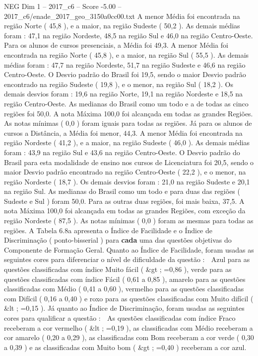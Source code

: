 \begin{textsample}{NEG Dim 1 – 2017\_c6 – Score -5.00 – 2017\_c6/enade\_2017\_geo\_3150a0cc00.txt}
A menor Média foi encontrada na região Norte ( 45,8 ), e a maior, na região Sudeste ( 50,2 ).
As demais médias foram : 47,1 na região Nordeste, 48,5 na região Sul e 46,0 na região Centro-Oeste.
Para os alunos de cursos presenciais, a Média foi 49,3.
A menor Média foi encontrada na região Norte ( 45,8 ), e a maior, na região Sul ( 55,5 ).
As demais médias foram : 47,7 na região Nordeste, 51,7 na região Sudeste e 46,6 na região Centro-Oeste.
O Desvio padrão do Brasil foi 19,5, sendo o maior Desvio padrão encontrado na região Sudeste ( 19,8 ), e o menor, na região Sul ( 18,2 ).
Os demais desvios foram : 19,6 na região Norte, 19,1 na região Nordeste e 18,5 na região Centro-Oeste.
As medianas do Brasil como um todo e a de todas as cinco regiões foi 50,0.
A nota Máxima 100,0 foi alcançada em todas as grandes Regiões.
As notas mínimas ( 0,0 ) foram iguais para todas as regiões.
Já para os alunos de cursos a Distância, a Média foi menor, 44,3.
A menor Média foi encontrada na região Nordeste ( 41,2 ), e a maior, na região Sudeste ( 46,0 ).
As demais médias foram : 43,9 na região Sul e 43,6 na região Centro-Oeste.
O Desvio padrão do Brasil para esta modalidade de ensino nos cursos de Licenciatura foi 20,5, sendo o maior Desvio padrão encontrado na região Centro-Oeste ( 22,2 ), e o menor, na região Nordeste ( 18,7 ).
Os demais desvios foram : 21,0 na região Sudeste e 20,1 na região Sul.
As medianas do Brasil como um todo e para duas das regiões ( Sudeste e Sul ) foram 50,0.
Para as outras duas regiões, foi mais baixa, 37,5.
A nota Máxima 100,0 foi alcançada em todas as grandes Regiões, com exceção da região Nordeste ( 87,5 ).
As notas mínimas ( 0,0 ) foram as mesmas para todas as regiões.
A Tabela 6.8a apresenta o Índice de Facilidade e o Índice de Discriminação ( ponto-bisserial ) para \textbf{cada} uma das questões objetivas do Componente de Formação Geral.
Quanto ao Índice de Facilidade, foram usadas as seguintes cores para diferenciar o nível de dificuldade da questão :  Azul para as questões classificadas com índice Muito fácil ( \&gt ; =0,86 ), verde para as questões classificadas com índice Fácil ( 0,61 a 0,85 ), amarelo para as questões classificadas com Médio ( 0,41 a 0,60 ), vermelho para as questões classificadas com Difícil ( 0,16 a 0,40 ) e roxo para as questões classificadas com Muito difícil ( \&lt ; =0,15 ).
Já quanto ao Índice de Discriminação, foram usadas as seguintes cores para qualificar a questão :  As questões classificadas com índice Fraco receberam a cor vermelho ( \&lt ; =0,19 ), as classificadas com Médio receberam a cor amarelo ( 0,20 a 0,29 ), as classificadas com Bom receberam a cor verde ( 0,30 a 0,39 ) e as classificadas com Muito bom ( \&gt ; =0,40 ) receberam a cor azul.

\end{textsample}
